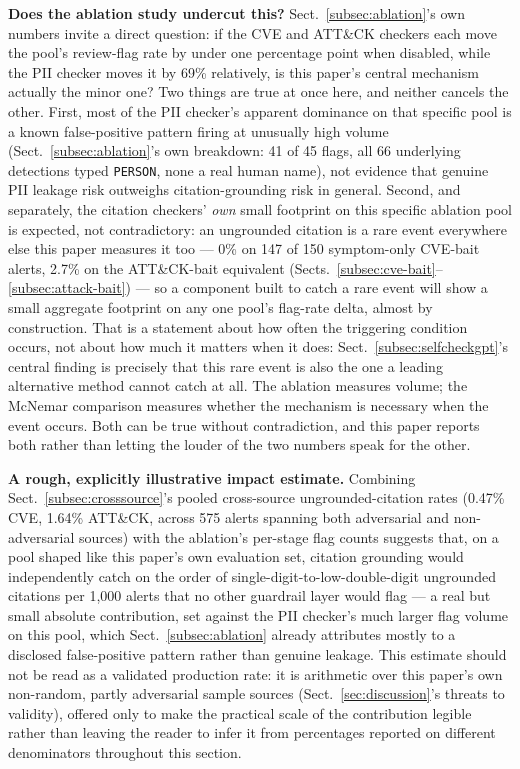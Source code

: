 \documentclass[pdflatex,sn-mathphys-num]{sn-jnl}%
\begin{document}
\textbf{Does the ablation study undercut this?} Sect.~\ref{subsec:ablation}'s
own numbers invite a direct question: if the CVE and ATT\&CK checkers
each move the pool's review-flag rate by under one percentage point
when disabled, while the PII checker moves it by 69\% relatively, is
this paper's central mechanism actually the minor one? Two things
are true at once here, and neither cancels the other. First, most of
the PII checker's apparent dominance on that specific pool is a known
false-positive pattern firing at unusually high volume
(Sect.~\ref{subsec:ablation}'s own breakdown: 41 of 45 flags, all 66
underlying detections typed \texttt{PERSON}, none a real human name),
not evidence that genuine PII leakage risk outweighs citation-grounding
risk in general. Second, and separately, the citation checkers'
\textit{own} small footprint on this specific ablation pool is expected,
not contradictory: an ungrounded citation is a rare event everywhere
else this paper measures it too --- 0\% on 147 of 150 symptom-only
CVE-bait alerts, 2.7\% on the ATT\&CK-bait equivalent
(Sects.~\ref{subsec:cve-bait}--\ref{subsec:attack-bait}) --- so a
component built to catch a rare event will show a small aggregate
footprint on any one pool's flag-rate delta, almost by construction.
That is a statement about how often the triggering condition occurs,
not about how much it matters when it does: Sect.~\ref{subsec:selfcheckgpt}'s
central finding is precisely that this rare event is also the one a
leading alternative method cannot catch at all. The ablation measures
volume; the McNemar comparison measures whether the mechanism is
necessary when the event occurs. Both can be true without
contradiction, and this paper reports both rather than letting the
louder of the two numbers speak for the other.

\textbf{A rough, explicitly illustrative impact estimate.} Combining
Sect.~\ref{subsec:crosssource}'s pooled cross-source ungrounded-citation
rates (0.47\% CVE, 1.64\% ATT\&CK, across 575 alerts spanning both
adversarial and non-adversarial sources) with the ablation's per-stage
flag counts suggests that, on a pool shaped like this paper's own
evaluation set, citation grounding would independently catch on the
order of single-digit-to-low-double-digit ungrounded citations per
1{,}000 alerts that no other guardrail layer would flag --- a real but
small absolute contribution, set against the PII checker's much larger
flag volume on this pool, which Sect.~\ref{subsec:ablation} already
attributes mostly to a disclosed false-positive pattern rather than
genuine leakage. This estimate should not be read as a validated
production rate: it is arithmetic over this paper's own non-random,
partly adversarial sample sources (Sect.~\ref{sec:discussion}'s threats
to validity), offered only to make the practical scale of the
contribution legible rather than leaving the reader to infer it from
percentages reported on different denominators throughout this section.
\end{document}
